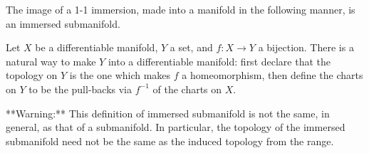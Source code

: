 The image of a 1-1 immersion, made into a manifold in the following manner, is an immersed submanifold.

Let $X$ be a differentiable manifold, $Y$ a set, and $f: X \to Y$ a bijection. There is a natural way to make $Y$ into a differentiable manifold: first declare that the topology on $Y$ is the one which makes $f$ a homeomorphism, then define the charts on $Y$ to be the pull-backs via $f^{-1}$ of the charts on $X$.

**Warning:** This definition of immersed submanifold is not the same, in general, as that of a submanifold. In particular, the topology of the immersed submanifold need not be the same as the induced topology from the range.
